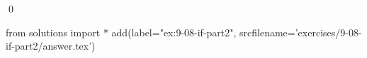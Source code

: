 
\begin{ex}
  \label{ex:9-08-if-part2}
  
  \qed
\end{ex}
\begin{python0}
from solutions import *
add(label="ex:9-08-if-part2",
    srcfilename='exercises/9-08-if-part2/answer.tex')
\end{python0}
